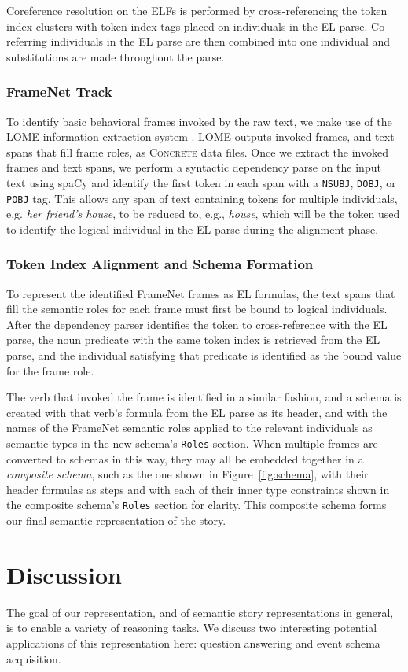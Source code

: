 Coreference resolution on the ELFs is performed by cross-referencing the token index clusters with token index tags placed on individuals in the EL parse. Co-referring individuals in the EL parse are then combined into one individual and substitutions are made throughout the parse.

\subsubsection{FrameNet Track}
To identify basic behavioral frames invoked by the raw text, we make use of the LOME information extraction system \citep{lome}. LOME outputs invoked frames, and text spans that fill frame roles, as \textsc{Concrete} data files. Once we extract the invoked frames and text spans, we perform a syntactic dependency parse on the input text using spaCy \citep{spacy2} and identify the first token in each span with a \texttt{NSUBJ}, \texttt{DOBJ}, or \texttt{POBJ} tag. This allows any span of text containing tokens for multiple individuals, e.g. \textit{her friend's house}, to be reduced to, e.g., \textit{house}, which will be the token used to identify the logical individual in the EL parse during the alignment phase.

\subsubsection{Token Index Alignment and Schema Formation}
To represent the identified FrameNet frames as EL formulas, the text spans that fill the semantic roles for each frame must first be bound to logical individuals. After the dependency parser identifies the token to cross-reference with the EL parse, the noun predicate with the same token index is retrieved from the EL parse, and the individual satisfying that predicate is identified as the bound value for the frame role.

The verb that invoked the frame is identified in a similar fashion, and a schema is created with that verb's formula from the EL parse as its header, and with the names of the FrameNet semantic roles applied to the relevant individuals as semantic types in the new schema's \texttt{Roles} section. When multiple frames are converted to schemas in this way, they may all be embedded together in a \textit{composite schema}, such as the one shown in Figure~\ref{fig:schema}, with their header formulas as steps and with each of their inner type constraints shown in the composite schema's \texttt{Roles} section for clarity. This composite schema forms our final semantic representation of the story.

\section{Discussion}
The goal of our representation, and of semantic story representations in general, is to enable a variety of reasoning tasks. We discuss two interesting potential applications of this representation here: question answering and event schema acquisition.